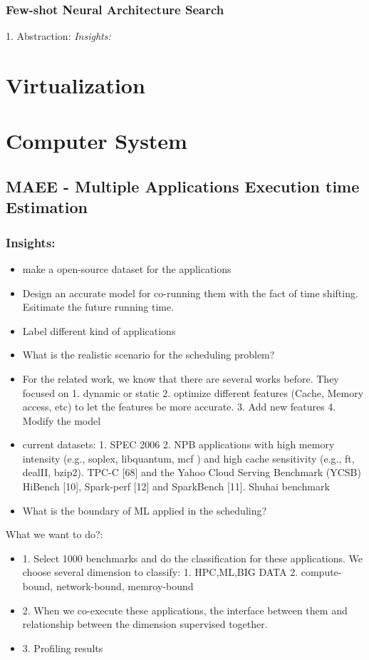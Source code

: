 \documentclass[UTF8]{article}
\begin{document}
\subsubsection{Few-shot Neural Architecture Search}
1. Abstraction: 
\emph{Insights:} 
\section{Virtualization}
\section{Computer System}
\subsection{MAEE - Multiple Applications Execution time Estimation}
\subsubsection{Insights:}
\begin{itemize}
	\item make a open-source dataset for the applications 
	\item Design an accurate model for co-running them with the fact of time shifting. Esitimate the future running time.
	\item Label different kind of applications
	\item What is the realistic scenario for the scheduling problem?
    \item For the related work, we know that there are several works before. They focused on 1. dynamic or static 2. optimize different features (Cache, Memory access, etc) to let the features be more accurate. 3. Add new features 4. Modify the model
    \item current datasets: 1. SPEC 2006 2. NPB applications with high memory intensity (e.g., soplex, libquantum, mcf ) and high cache sensitivity (e.g., ft, dealII, bzip2). TPC-C [68] and the Yahoo Cloud Serving Benchmark (YCSB) HiBench [10], Spark-perf [12] and SparkBench [11]. Shuhai benchmark
    \item What is the boundary of ML applied in the scheduling?
\end{itemize}

What we want to do?:
\begin{itemize}
    \item 1. Select 1000 benchmarks and do the classification for these applications. We choose several dimension to classify: 1. HPC,ML,BIG DATA 2. compute-bound, network-bound, memroy-bound
    \item 2. When we co-execute these applications, the interface between them and relationship between the dimension supervised together.
    \item 3. Profiling results
\end{itemize}
\end{document}
